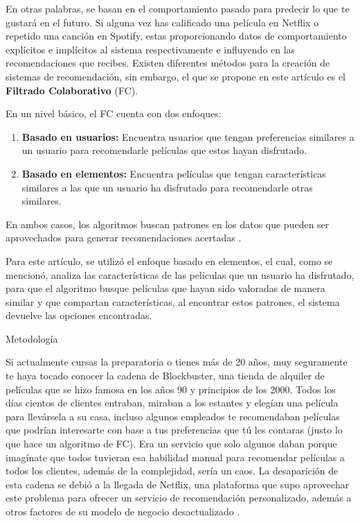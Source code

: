 \documentclass[letterpaper,10pt,final,hyphenatedtitles]{papertexKS}
\begin{document}
\begin{news}{2}
	En otras palabras, se basan en el comportamiento pasado para predecir lo que te gustará en el futuro. Si alguna vez has calificado una película en Netflix o repetido una canción en Spotify, estas proporcionando datos de comportamiento explícitos e implícitos al sistema respectivamente e influyendo en las recomendaciones que recibes. Existen diferentes métodos para la creación de sistemas de recomendación, sin embargo, el que se propone en este artículo es el \textbf{Filtrado Colaborativo} (FC).

	En un nivel básico, el FC cuenta con dos enfoques:

	\begin{enumerate}
		\item \textbf{Basado en usuarios:} Encuentra usuarios que tengan preferencias similares a un usuario para recomendarle películas que estos hayan disfrutado.
		\item \textbf{Basado en elementos:} Encuentra películas que tengan características similares a las que un usuario ha disfrutado para recomendarle otras similares.
	\end{enumerate}
	
    En ambos casos, los algoritmos buscan patrones en los datos que pueden ser aprovechados para generar recomendaciones acertadas \cite{papadakis2022collaborative}. 

	Para este artículo, se utilizó el enfoque basado en elementos, el cual, como se mencionó, analiza las características de las películas que un usuario ha disfrutado, para que el algoritmo busque películas que hayan sido valoradas de manera similar y que compartan características, al encontrar estos patrones, el sistema devuelve las opciones encontradas.


	\noindent\textcolor{color}{\Large{Metodología}}

	Si actualmente cursas la preparatoria o tienes más de 20 años, muy seguramente te haya tocado conocer la cadena de Blockbuster, una tienda de alquiler de películas que se hizo famosa en los años 90 y principios de los 2000. Todos los días cientos de clientes entraban, miraban a los estantes y elegían una película para llevársela a su casa, incluso algunos empleados te recomendaban películas que podrían interesarte con base a tus preferencias que tú les contaras (justo lo que hace un algoritmo de FC). Era un servicio que solo algunos daban porque imagínate que todos tuvieran esa habilidad manual para recomendar películas a todos los clientes, además de la complejidad, sería un caos. La desaparición de esta cadena se debió a la llegada de Netflix, una plataforma que supo aprovechar este problema para ofrecer un servicio de recomendación personalizado, además a otros factores de su modelo de negocio desactualizado \cite{davis2013blockbuster}.


\end{news}
\end{document}
